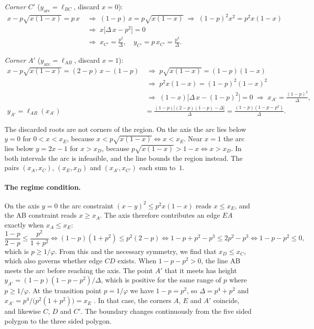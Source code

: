 \documentclass[11pt]{article}
\begin{document}
\emph{Corner $C'$} ($y_{\mathrm{arc}}=\ell_{BC}$, discard $x=0$):
\begin{align*}
x-p\sqrt{x(1-x)}=p\,x
&\;\Rightarrow\; (1-p)\,x = p\sqrt{x(1-x)}
\;\Rightarrow\; (1-p)^2x^2 = p^2x(1-x)\\
&\;\Rightarrow\; x\bigl[\Delta\,x-p^2\bigr]=0\\
&\;\Rightarrow\; x_{C'}=\frac{p^2}{\Delta},\quad y_{C'}=p\,x_{C'}=\frac{p^3}{\Delta}.
\end{align*}

\emph{Corner $A'$} ($y_{\mathrm{arc}}=\ell_{AB}$, discard $x=1$):
\begin{align*}
x-p\sqrt{x(1-x)} = (2-p)\,x-(1-p)
&\;\Rightarrow\; p\sqrt{x(1-x)} = (1-p)(1-x)\\
&\;\Rightarrow\; p^2x(1-x)=(1-p)^2(1-x)^2\\
&\;\Rightarrow\; (1-x)\bigl[\Delta\,x-(1-p)^2\bigr]=0
\;\Rightarrow\; x_{A'}=\frac{(1-p)^2}{\Delta},\\
y_{A'}=\ell_{AB}(x_{A'})
&=\frac{(1-p)\bigl[(2-p)(1-p)-\Delta\bigr]}{\Delta}
=\frac{(1-p)(1-p-p^2)}{\Delta}.
\end{align*}

The discarded roots are not corners of the region. On the axis the arc lies
below $y=0$ for $0<x<x_E$, because $x<p\sqrt{x(1-x)}\iff x<x_E$. Near $x=1$
the arc lies below $y=2x-1$ for $x>x_D$, because
$p\sqrt{x(1-x)}>1-x\iff x>x_D$. In both intervals the arc is infeasible, and
the line bounds the region instead. The pairs $(x_A,x_C)$, $(x_E,x_D)$ and
$(x_{A'},x_{C'})$ each sum to~$1$.

\paragraph{The regime condition.} On the axis $y=0$ the arc constraint
$(x-y)^2\le p^2x(1-x)$ reads $x\le x_E$, and the AB constraint reads
$x\ge x_A$. The axis therefore contributes an edge $EA$ exactly when
$x_A\le x_E$:
\[
\frac{1-p}{2-p}\le\frac{p^2}{1+p^2}
\iff (1-p)(1+p^2)\le p^2(2-p)
\iff 1-p+p^2-p^3\le 2p^2-p^3
\iff 1-p-p^2\le 0,
\]
which is $p\ge1/\varphi$. From this and the necessary symmetry,
we find that $x_D\le x_C$, which also governs whether edge $CD$ exists. When
$1-p-p^2>0$, the line AB meets the arc before reaching the axis. The
point $A'$ that it meets has height $y_{A'}=(1-p)(1-p-p^2)/\Delta$, which is positive for
 the same range of $p$ where $p\ge1/\varphi$. At the transition point $p=1/\varphi$ we have
$1-p=p^2$, so $\Delta=p^4+p^2$ and $x_{A'}=p^4/\bigl(p^2(1+p^2)\bigr)=x_E$ .
In that case, the corners $A$, $E$ and $A'$ coincide, and likewise $C$, $D$ and $C'$. The
boundary changes continuously from the five sided polygon to the three sided polygon.
\end{document}
